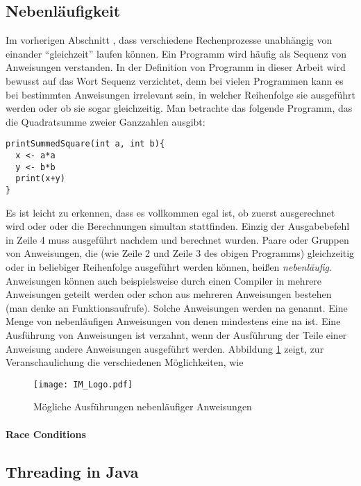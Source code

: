 \documentclass[12pt,a4paper,listof=totocnumbered,parskip=half]{scrreprt}
\begin{document}
\subsection{Nebenläufigkeit}
Im vorherigen Abschnitt , dass verschiedene Rechenprozesse unabhängig von einander \enquote{gleichzeit} laufen können. Ein Programm wird häufig als Sequenz von Anweisungen verstanden. In der Definition von Programm in dieser Arbeit wird bewusst auf das Wort Sequenz verzichtet, denn bei vielen Programmen kann es bei bestimmten Anweisungen irrelevant sein, in welcher Reihenfolge sie ausgeführt werden oder ob sie sogar gleichzeitig. Man betrachte das folgende Programm, das die Quadratsumme zweier Ganzzahlen ausgibt: 
\begin{lstlisting}
printSummedSquare(int a, int b){
  x <- a*a
  y <- b*b
  print(x+y)
}
\end{lstlisting}
Es ist leicht zu erkennen, dass es vollkommen egal ist, ob zuerst  ausgerechnet wird oder  oder die Berechnungen simultan stattfinden. Einzig der Ausgabebefehl in Zeile 4 muss ausgeführt nachdem  und  berechnet wurden. Paare oder Gruppen von Anweisungen, die (wie Zeile 2 und Zeile 3 des obigen Programms) gleichzeitig oder in beliebiger Reihenfolge ausgeführt werden können, heißen \emph{nebenläufig}. Anweisungen können auch beispielsweise durch einen Compiler in mehrere Anweisungen geteilt werden oder schon aus mehreren Anweisungen bestehen (man denke an Funktionsaufrufe). Solche Anweisungen werden \gls{na} genannt. Eine Menge von nebenläufigen Anweisungen von denen mindestens eine \gls{na} ist. Eine Ausführung von Anweisungen ist verzahnt, wenn der Ausführung der Teile einer  Anweisung andere Anweisungen ausgeführt werden. Abbildung \ref{fig:concAnweisungen} zeigt, zur Veranschaulichung die verschiedenen Möglichkeiten, wie 
\begin{figure}
\texttt{[image: IM\_Logo.pdf]}
\caption{Mögliche Ausführungen nebenläufiger Anweisungen}\label{fig:concAnweisungen}
\end{figure}

\paragraph{Race Conditions}
\subsection{Threading in Java}
\end{document}
